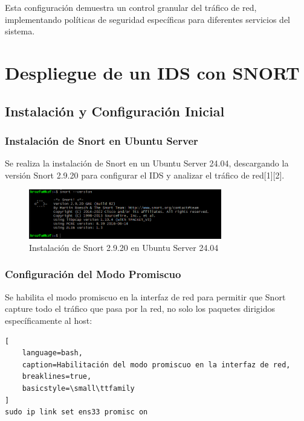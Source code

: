 \documentclass[12pt,a4paper]{article}
\begin{document}
Esta configuración demuestra un control granular del tráfico de red,
implementando políticas de seguridad específicas para diferentes servicios del
sistema.

\section{Despliegue de un IDS con SNORT}

\subsection{Instalación y Configuración Inicial}

\subsubsection{Instalación de Snort en Ubuntu Server}

Se realiza la instalación de Snort en un Ubuntu Server 24.04, descargando la
versión Snort 2.9.20 para configurar el IDS y analizar el tráfico de red[1][2].

\begin{figure}[H]
  \centering
  \includegraphics[width=0.75\textwidth]{./assets/img12.png}
  \caption{Instalación de Snort 2.9.20 en Ubuntu Server 24.04}
  \label{fig:snort-installation}
\end{figure}

\subsubsection{Configuración del Modo Promiscuo}

Se habilita el modo promiscuo en la interfaz de red para permitir que Snort
capture todo el tráfico que pasa por la red, no solo los paquetes dirigidos
específicamente al host:

\begin{lstlisting}[
    language=bash, 
    caption=Habilitación del modo promiscuo en la interfaz de red,
    breaklines=true,
    basicstyle=\small\ttfamily
]
sudo ip link set ens33 promisc on
\end{lstlisting}
\end{document}
